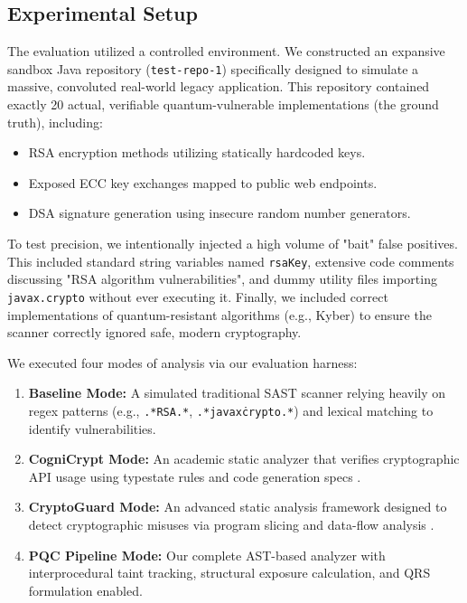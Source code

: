 \documentclass[conference]{IEEEtran}
\begin{document}
\subsection{Experimental Setup}
The evaluation utilized a controlled environment. We constructed an expansive sandbox Java repository (\texttt{test-repo-1}) specifically designed to simulate a massive, convoluted real-world legacy application. This repository contained exactly 20 actual, verifiable quantum-vulnerable implementations (the ground truth), including:
\begin{itemize}
    \item RSA encryption methods utilizing statically hardcoded keys.
    \item Exposed ECC key exchanges mapped to public web endpoints.
    \item DSA signature generation using insecure random number generators.
\end{itemize}
To test precision, we intentionally injected a high volume of "bait" false positives. This included standard string variables named \texttt{rsaKey}, extensive code comments discussing "RSA algorithm vulnerabilities", and dummy utility files importing \texttt{javax.crypto} without ever executing it. Finally, we included correct implementations of quantum-resistant algorithms (e.g., Kyber) to ensure the scanner correctly ignored safe, modern cryptography.

We executed four modes of analysis via our evaluation harness:
\begin{enumerate}
    \item \textbf{Baseline Mode:} A simulated traditional SAST scanner relying heavily on regex patterns (e.g., \texttt{.*RSA.*}, \texttt{.*javax\.crypto.*}) and lexical matching to identify vulnerabilities.
    \item \textbf{CogniCrypt Mode:} An academic static analyzer that verifies cryptographic API usage using typestate rules and code generation specs \cite{kruger2017}.
    \item \textbf{CryptoGuard Mode:} An advanced static analysis framework designed to detect cryptographic misuses via program slicing and data-flow analysis \cite{rahaman2019}.
    \item \textbf{PQC Pipeline Mode:} Our complete AST-based analyzer with interprocedural taint tracking, structural exposure calculation, and QRS formulation enabled.
\end{enumerate}
\end{document}
